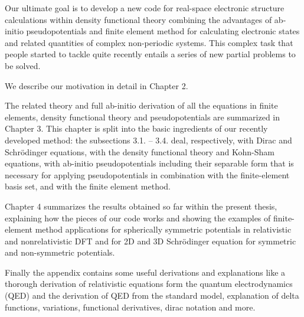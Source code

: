 Our ultimate goal is to develop a new code for real-space electronic structure
calculations within density functional theory combining the advantages
of ab-initio pseudopotentials and finite element method for calculating
electronic states and related quantities of complex non-periodic systems.
This complex task that people started to tackle quite recently
\cite{pask1, pask2, ortiz1, ortiz2}
entails a series of new partial problems to be solved.

We describe our motivation in detail in Chapter 2.

The related theory and full ab-initio derivation of all the equations
in finite elements, density functional theory and pseudopotentials
are summarized in Chapter 3.
This chapter is split into the basic ingredients of our recently developed
method: the subsections 3.1. -- 3.4. deal, respectively, with Dirac and
Schr\"odinger equations, with the density functional theory and Kohn-Sham
equations, with ab-initio pseudopotentials including their separable form that
is necessary for applying pseudopotentials in combination with the
finite-element basis set, and with the finite element method.

Chapter 4 summarizes the results obtained so far within the
present thesis, explaining how the pieces of our code works and showing
the examples of finite-element method applications for spherically symmetric
potentials in relativistic and nonrelativistic DFT and for 2D and 3D
Schr\"odinger equation for symmetric and non-symmetric potentials.

Finally the appendix contains some useful derivations and explanations
like a thorough derivation of relativistic equations form the quantum
electrodynamics (QED) and the derivation of QED from the standard model,
explanation of delta functions, variations, functional derivatives,
dirac notation and more.
